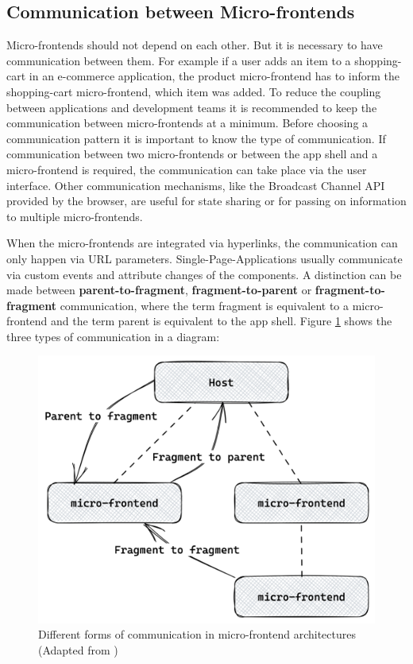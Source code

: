 \subsection{Communication between Micro-frontends}\label{subsection:background:micro-frontend:communication-patterns}

Micro-frontends should not depend on each other. But it is necessary to have communication between them. For example if a user adds an item to a shopping-cart in an e-commerce application, the product micro-frontend has to inform the shopping-cart micro-frontend, which item was added. To reduce the coupling between applications and development teams it is recommended to keep the communication between micro-frontends at a minimum. Before choosing a communication pattern it is important to know the type of communication. If communication between two micro-frontends or between the app shell and a micro-frontend is required, the communication can take place via the user interface. Other communication mechanisms, like the Broadcast Channel API provided by the browser, are useful for state sharing or for passing on information to multiple micro-frontends. \cite{book:2020:geers:background:micro-frontends:micro-frontends-in-action}

\bigskip

\noindent When the micro-frontends are integrated via hyperlinks, the communication can only happen via URL parameters. Single-Page-Applications usually communicate via custom events and attribute changes of the components. \cite[100]{book:2020:geers:background:micro-frontends:micro-frontends-in-action} \cite[315-316]{book:2019:farrell:background:micro-frontends:web-components-in-action} A distinction can be made between \textbf{parent-to-fragment}, \textbf{fragment-to-parent} or \textbf{fragment-to-fragment} communication, where the term fragment is equivalent to a micro-frontend and the term parent is equivalent to the app shell. \cite{book:2020:geers:background:micro-frontends:micro-frontends-in-action} Figure \ref{fig:background:micro-frontend:communication:communication-patterns} shows the three types of communication in a diagram:

\ifshowImages
\begin{figure}[H]
    \centering
    \includegraphics[width=0.5\linewidth]{images/background/communication/communication-patterns.png}
    \caption{Different forms of communication in micro-frontend architectures (Adapted from \cite[100]{book:2020:geers:background:micro-frontends:micro-frontends-in-action})}\label{fig:background:micro-frontend:communication:communication-patterns}
\end{figure}
\fi

